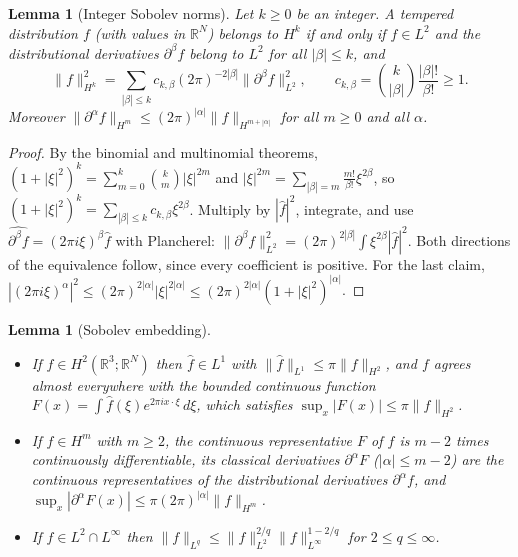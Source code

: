 \documentclass[11pt]{article}
\newtheorem{lemma}[theorem]{Lemma}
\theoremstyle{definition}
\theoremstyle{plain}
\newcommand{\R}{\mathbb R}
\newcommand{\norm}[1]{\lVert #1\rVert}
\begin{document}
\begin{lemma}[Integer Sobolev norms]\label{lem:sobolev-norms}
Let $k\geq0$ be an integer.  A tempered distribution $f$ (with values in
$\R^N$) belongs to $H^k$ if and only if $f\in L^2$ and the distributional
derivatives $\partial^\beta f$ belong to $L^2$ for all $|\beta|\leq k$,
and
\[
 \norm f_{H^k}^2=\sum_{|\beta|\leq k}c_{k,\beta}(2\pi)^{-2|\beta|}
 \norm{\partial^\beta f}_{L^2}^2,
 \qquad c_{k,\beta}=\binom{k}{|\beta|}\frac{|\beta|!}{\beta!}\geq1 .
\]
Moreover $\norm{\partial^\alpha f}_{H^{m}}\leq(2\pi)^{|\alpha|}
\norm f_{H^{m+|\alpha|}}$ for all $m\geq0$ and all $\alpha$.
\end{lemma}

\begin{proof}
By the binomial and multinomial theorems,
$(1+|\xi|^2)^k=\sum_{m=0}^k\binom km|\xi|^{2m}$ and
$|\xi|^{2m}=\sum_{|\beta|=m}\frac{m!}{\beta!}\xi^{2\beta}$, so
$(1+|\xi|^2)^k=\sum_{|\beta|\leq k}c_{k,\beta}\xi^{2\beta}$.  Multiply by
$|\widehat f|^2$, integrate, and use $\widehat{\partial^\beta
f}=(2\pi i\xi)^\beta\widehat f$ with Plancherel:
$\norm{\partial^\beta f}_{L^2}^2=(2\pi)^{2|\beta|}\int\xi^{2\beta}
|\widehat f|^2$.  Both directions of the equivalence follow, since every
coefficient is positive.  For the last claim,
$|(2\pi i\xi)^\alpha|^2\leq(2\pi)^{2|\alpha|}|\xi|^{2|\alpha|}\leq
(2\pi)^{2|\alpha|}(1+|\xi|^2)^{|\alpha|}$.
\end{proof}

\begin{lemma}[Sobolev embedding]\label{lem:embedding}
\begin{itemize}
\item[(a)] If $f\in H^2(\R^3;\R^N)$ then $\widehat f\in L^1$ with
$\norm{\widehat f}_{L^1}\leq\pi\norm f_{H^2}$, and $f$ agrees almost
everywhere with the bounded continuous function
$F(x)=\int\widehat f(\xi)e^{2\pi ix\cdot\xi}\,d\xi$, which satisfies
$\sup_x|F(x)|\leq\pi\norm f_{H^2}$.
\item[(b)] If $f\in H^m$ with $m\geq2$, the continuous representative $F$
of $f$ is $m-2$ times continuously differentiable, its classical
derivatives $\partial^\alpha F$ ($|\alpha|\leq m-2$) are the continuous
representatives of the distributional derivatives $\partial^\alpha f$, and
$\sup_x|\partial^\alpha F(x)|\leq\pi(2\pi)^{|\alpha|}\norm f_{H^m}$.
\item[(c)] If $f\in L^2\cap L^\infty$ then $\norm f_{L^q}\leq
\norm f_{L^2}^{2/q}\norm f_{L^\infty}^{1-2/q}$ for $2\leq q\leq\infty$.
\end{itemize}
\end{lemma}
\end{document}
